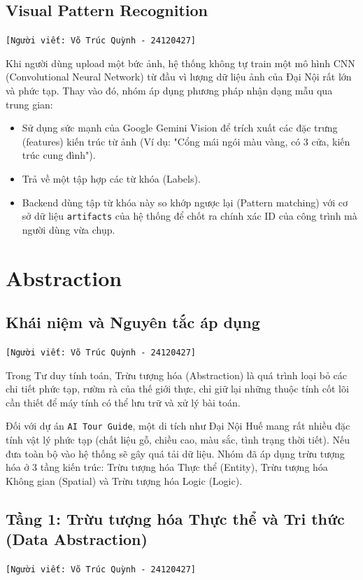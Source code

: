 \subsection{Visual Pattern Recognition}
\texttt{[Người viết: Võ Trúc Quỳnh - 24120427]}

Khi người dùng upload một bức ảnh, hệ thống không tự train một mô hình CNN (Convolutional Neural Network) từ đầu vì lượng dữ liệu ảnh của Đại Nội rất lớn và phức tạp. Thay vào đó, nhóm áp dụng phương pháp nhận dạng mẫu qua trung gian:
\begin{itemize}
    \item Sử dụng sức mạnh của Google Gemini Vision để trích xuất các đặc trưng (features) kiến trúc từ ảnh (Ví dụ: "Cổng mái ngói màu vàng, có 3 cửa, kiến trúc cung đình").
    \item Trả về một tập hợp các từ khóa (Labels).
    \item Backend dùng tập từ khóa này so khớp ngược lại (Pattern matching) với cơ sở dữ liệu \texttt{artifacts} của hệ thống để chốt ra chính xác ID của công trình mà người dùng vừa chụp.
\end{itemize}

\section{Abstraction}
\subsection{Khái niệm và Nguyên tắc áp dụng}
\texttt{[Người viết: Võ Trúc Quỳnh - 24120427]}

Trong Tư duy tính toán, Trừu tượng hóa (Abstraction) là quá trình loại bỏ các chi tiết phức tạp, rườm rà của thế giới thực, chỉ giữ lại những thuộc tính cốt lõi cần thiết để máy tính có thể lưu trữ và xử lý bài toán. 

Đối với dự án \texttt{AI Tour Guide}, một di tích như Đại Nội Huế mang rất nhiều đặc tính vật lý phức tạp (chất liệu gỗ, chiều cao, màu sắc, tình trạng thời tiết). Nếu đưa toàn bộ vào hệ thống sẽ gây quá tải dữ liệu. Nhóm đã áp dụng trừu tượng hóa ở 3 tầng kiến trúc: Trừu tượng hóa Thực thể (Entity), Trừu tượng hóa Không gian (Spatial) và Trừu tượng hóa Logic (Logic).

\subsection{Tầng 1: Trừu tượng hóa Thực thể và Tri thức (Data Abstraction)}
\texttt{[Người viết: Võ Trúc Quỳnh - 24120427]}

